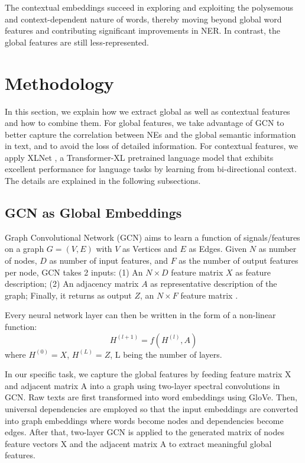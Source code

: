 \documentclass[runningheads]{llncs}
\begin{document}
The contextual embeddings succeed in exploring and exploiting the polysemous and context-dependent nature of words, thereby moving beyond global word features and contributing significant improvements in NER. In contrast, the global features are still less-represented. 
\vspace{-0.2cm}
\section{Methodology}
\label{sec:method}

In this section, we explain how we extract global as well as contextual features and how to combine them. For global features, we take advantage of GCN \cite{seti2020named,cetoli2017graph} to better capture the correlation between NEs and the global semantic information in text, and to avoid the loss of detailed information. For contextual features, we apply XLNet \cite{yang2019xlnet}, a Transformer-XL pretrained language model that exhibits excellent performance for language tasks by learning from bi-directional context.
The details are explained in the following subsections.

\subsection{GCN as Global Embeddings}

Graph Convolutional Network (GCN) aims to learn a function of signals/features on a graph $G=(V,E)$ with $V$ as Vertices and $E$ as Edges. Given $N$ as number of nodes, $D$ as number of input features, and $F$ as the number of output features per node, GCN takes 2 inputs:
(1) An $N \times D$ feature matrix $X$ as feature description; (2) An adjacency matrix $A$ as representative description of the graph; Finally, it returns as output $Z$, an $N \times F$ feature matrix \cite{duvenaud2015convolutional}.

Every neural network layer can then be written in the form of a non-linear function:
\begin{equation}
    H^{(l+1)} = f(H^{(l)},A)
\end{equation}
where $H^{(0)} = X$, $H^{(L)} = Z$,  L being the number of layers. 

In our specific task, we capture the global features by feeding feature matrix X and adjacent matrix A into a graph using two-layer spectral convolutions in GCN. Raw texts are first transformed into word embeddings using GloVe. Then, universal dependencies are employed so that the input embeddings are converted into graph embeddings where words become nodes and dependencies become edges. After that, two-layer GCN is applied to the generated matrix of nodes feature vectors X and the adjacent matrix A to extract meaningful global features.
\end{document}
